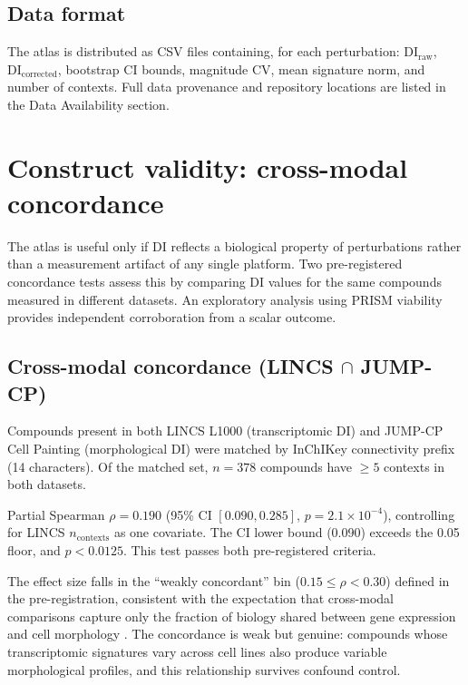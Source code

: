 \documentclass[11pt]{article}
\begin{document}
\subsection{Data format}

The atlas is distributed as CSV files containing, for each perturbation:
$\mathrm{DI}_{\mathrm{raw}}$, $\mathrm{DI}_{\mathrm{corrected}}$,
bootstrap CI bounds, magnitude CV, mean signature norm, and number of
contexts.  Full data provenance and repository locations are listed in
the Data Availability section.


\section{Construct validity: cross-modal concordance}
\label{sec:concordance}

The atlas is useful only if DI reflects a biological property of
perturbations rather than a measurement artifact of any single platform.
Two pre-registered concordance tests assess this by comparing
DI values for the same compounds measured in different datasets.  An
exploratory analysis using PRISM viability provides independent
corroboration from a scalar outcome.

\subsection{Cross-modal concordance (LINCS \texorpdfstring{$\cap$}{∩} JUMP-CP)}

Compounds present in both LINCS L1000 (transcriptomic DI) and JUMP-CP
Cell Painting (morphological DI) were matched by InChIKey connectivity
prefix (14 characters).  Of the matched set, $n = 378$ compounds have
$\geq 5$ contexts in both datasets.

Partial Spearman $\rho = 0.190$ (95\% CI $[0.090, 0.285]$,
$p = 2.1 \times 10^{-4}$), controlling for LINCS $n_{\mathrm{contexts}}$
as one covariate.  The CI lower bound (0.090) exceeds the 0.05 floor,
and $p < 0.0125$.  This test passes both pre-registered criteria.

The effect size falls in the ``weakly concordant'' bin
($0.15 \leq \rho < 0.30$) defined in the pre-registration, consistent
with the expectation that cross-modal comparisons capture only the
fraction of biology shared between gene expression and cell morphology
\citep{haghighi2022crossmodal}.  The concordance is weak but genuine:
compounds whose transcriptomic signatures vary across cell lines also
produce variable morphological profiles, and this relationship survives
confound control.
\end{document}
